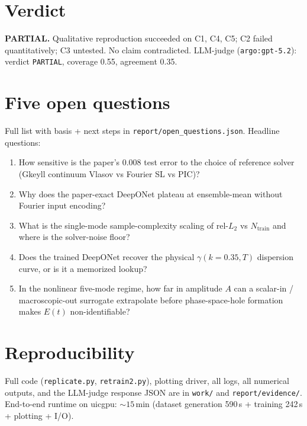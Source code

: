 \documentclass[11pt]{article}
\begin{document}
\section{Verdict}
\textbf{PARTIAL.} Qualitative reproduction succeeded on C1, C4, C5; C2 failed
quantitatively; C3 untested. No claim contradicted. LLM-judge (\texttt{argo:gpt-5.2}):
verdict \texttt{PARTIAL}, coverage 0.55, agreement 0.35.

\section{Five open questions}
Full list with basis + next steps in \texttt{report/open\_questions.json}. Headline questions:
\begin{enumerate}
    \item How sensitive is the paper's 0.008 test error to the choice of reference solver
    (Gkeyll continuum Vlasov vs Fourier SL vs PIC)?
    \item Why does the paper-exact DeepONet plateau at ensemble-mean without Fourier
    input encoding?
    \item What is the single-mode sample-complexity scaling of rel-$L_2$ vs $N_{\text{train}}$
    and where is the solver-noise floor?
    \item Does the trained DeepONet recover the physical $\gamma(k=0.35, T)$ dispersion
    curve, or is it a memorized lookup?
    \item In the nonlinear five-mode regime, how far in amplitude $A$ can a
    scalar-in / macroscopic-out surrogate extrapolate before phase-space-hole
    formation makes $E(t)$ non-identifiable?
\end{enumerate}

\section{Reproducibility}
Full code (\texttt{replicate.py}, \texttt{retrain2.py}), plotting driver, all logs, all
numerical outputs, and the LLM-judge response JSON are in \texttt{work/} and
\texttt{report/evidence/}. End-to-end runtime on uicgpu:
$\sim 15$\,min (dataset generation 590\,s + training 242\,s + plotting + I/O).
\end{document}
